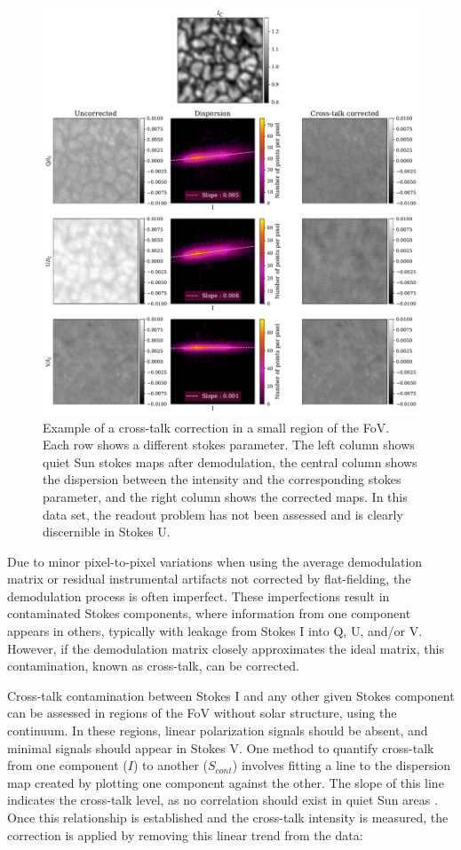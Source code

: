 \begin{figure}
  \includegraphics[width=\textwidth]{figures/Pipeline/xtalk_example.pdf}
  \caption[Cross-talk correction.]{Example of a cross-talk correction in a small region of the FoV. Each row shows a different stokes parameter. The left column shows quiet Sun stokes maps after demodulation, the central column shows the dispersion between the intensity and the corresponding stokes parameter, and the right column shows the corrected maps. In this data set, the readout problem has not been assessed and is clearly discernible in Stokes U.}
    \label{fig_pipeline: xtalk}
\end{figure}


Due to minor pixel-to-pixel variations when using the average demodulation matrix or residual instrumental artifacts not corrected by flat-fielding, the demodulation process is often imperfect. These imperfections result in contaminated Stokes components, where information from one component appears in others, typically with leakage from Stokes I into Q, U, and/or V. However, if the demodulation matrix closely approximates the ideal matrix, this contamination, known as cross-talk, can be corrected.

Cross-talk contamination between Stokes I and any other given Stokes component can be assessed in regions of the FoV without solar structure, using the continuum. In these regions, linear polarization signals should be absent, and minimal signals should appear in Stokes V. One method to quantify cross-talk from one component ($I$) to another ($S_{cont}$) involves fitting a line to the dispersion map created by plotting one component against the other. The slope of this line indicates the cross-talk level, as no correlation should exist in quiet Sun areas \citep{crosstalk-manolo}. Once this relationship is established and the cross-talk intensity is measured, the correction is applied by removing this linear trend from the data:

